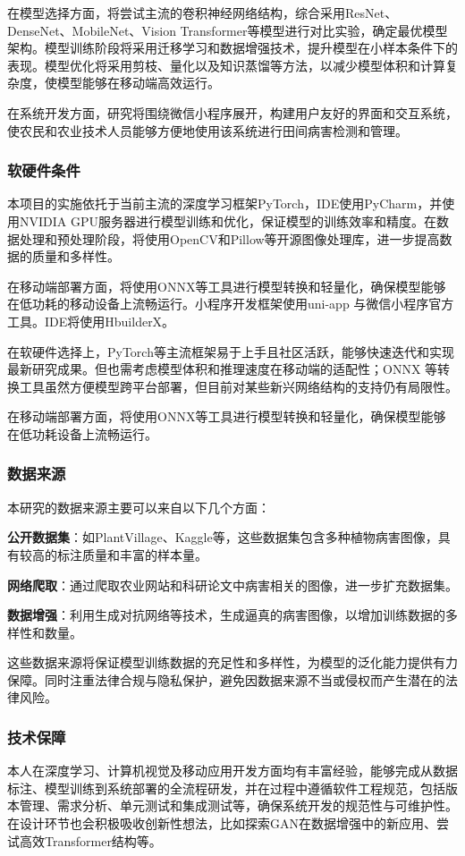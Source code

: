 在模型选择方面，将尝试主流的卷积神经网络结构，综合采用ResNet、DenseNet、MobileNet、Vision Transformer等模型进行对比实验，确定最优模型架构。模型训练阶段将采用迁移学习和数据增强技术，提升模型在小样本条件下的表现。模型优化将采用剪枝、量化以及知识蒸馏等方法，以减少模型体积和计算复杂度，使模型能够在移动端高效运行。

在系统开发方面，研究将围绕微信小程序展开，构建用户友好的界面和交互系统，使农民和农业技术人员能够方便地使用该系统进行田间病害检测和管理。

\subsubsection{软硬件条件}
本项目的实施依托于当前主流的深度学习框架PyTorch，IDE使用PyCharm，并使用NVIDIA GPU服务器进行模型训练和优化，保证模型的训练效率和精度。在数据处理和预处理阶段，将使用OpenCV和Pillow等开源图像处理库，进一步提高数据的质量和多样性。

在移动端部署方面，将使用ONNX等工具进行模型转换和轻量化，确保模型能够在低功耗的移动设备上流畅运行。小程序开发框架使用uni-app 与微信小程序官方工具。IDE将使用HbuilderX。

在软硬件选择上，PyTorch等主流框架易于上手且社区活跃，能够快速迭代和实现最新研究成果。但也需考虑模型体积和推理速度在移动端的适配性；ONNX 等转换工具虽然方便模型跨平台部署，但目前对某些新兴网络结构的支持仍有局限性。

在移动端部署方面，将使用ONNX等工具进行模型转换和轻量化，确保模型能够在低功耗设备上流畅运行。
\subsubsection{数据来源}
本研究的数据来源主要可以来自以下几个方面：

\textbf{公开数据集}：如PlantVillage、Kaggle等，这些数据集包含多种植物病害图像，具有较高的标注质量和丰富的样本量。

\textbf{网络爬取}：通过爬取农业网站和科研论文中病害相关的图像，进一步扩充数据集。

\textbf{数据增强}：利用生成对抗网络等技术，生成逼真的病害图像，以增加训练数据的多样性和数量。

这些数据来源将保证模型训练数据的充足性和多样性，为模型的泛化能力提供有力保障。同时注重法律合规与隐私保护，避免因数据来源不当或侵权而产生潜在的法律风险。

\subsubsection{技术保障}
本人在深度学习、计算机视觉及移动应用开发方面均有丰富经验，能够完成从数据标注、模型训练到系统部署的全流程研发，并在过程中遵循软件工程规范，包括版本管理、需求分析、单元测试和集成测试等，确保系统开发的规范性与可维护性。在设计环节也会积极吸收创新性想法，比如探索GAN在数据增强中的新应用、尝试高效Transformer结构等。

